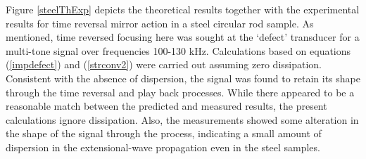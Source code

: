 \documentclass[11pt,letterpaper]{article}%
\begin{document}
Figure \ref{steelThExp} depicts the theoretical results together
with the experimental results for time reversal mirror
action in a steel circular rod sample. As mentioned, time reversed focusing here
was sought at the `defect' transducer for a multi-tone
signal over frequencies 100-130 kHz. Calculations based
on equations (\ref{impdefect}) and (\ref{strconv2}) were carried
out assuming zero dissipation. Consistent with the absence of
dispersion, the signal was found to retain its shape through the
time reversal and play back processes.  While there appeared to be
a reasonable match between the predicted and measured results, the
present calculations ignore dissipation.  Also, the measurements
showed some alteration in the shape of the signal through the
process, indicating a small amount of dispersion in the
extensional-wave propagation even in the steel samples. 
\end{document}
